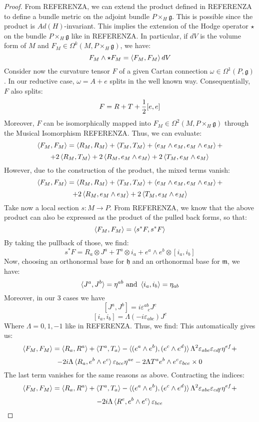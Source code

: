 \documentclass[12pt,a4paper]{report}
\theoremstyle{definition}
\theoremstyle{Theorem}
\theoremstyle{definition}
\theoremstyle{definition}
\begin{document}
	\begin{proof}
		From REFERENZA, we can extend the product defined in REFERENZA to define a bundle metric on the adjoint bundle $P\times_H \mathfrak{g}$. This is possible since the product is $Ad(H)$-invariant. This implies the extension of the Hodge operator $\star$ on the bundle $P\times_H \mathfrak{g}$ like in REFERENZA. In particular, if $dV$ is the volume form of $M$ and $F_M\in\Omega^k(M,P\times_H \mathfrak{g})$, we have:
		$$F_M\wedge \star F_M=\braket{F_M,F_M}dV$$ 
		Consider now the curvature tensor $F$ of a given Cartan connection $\omega\in\Omega^1(P,\mathfrak{g})$. In our reductive case, $\omega=A+e$ splits in the well known way. Consequentially, $F$ also splits:
		$$F=R+T+{1\over 2}[e,e]$$
		Moreover, $F$ can be isomorphically mapped into $F_M\in\Omega^2(M,P\times_H\mathfrak{g})$ through the Musical Isomorphism REFERENZA. Thus, we can evaluate:
		$$\braket{F_M,F_M}=\braket{R_M,R_M}+\braket{T_M,T_M}+\braket{e_M\wedge e_M,e_M\wedge e_M}+$$$$+2\braket{R_M,T_M}+2\braket{R_M,e_M\wedge e_M}+2\braket{T_M,e_M\wedge e_M}$$
		However, due to the construction of the product, the mixed terms vanish:
		$$\braket{F_M,F_M}=\braket{R_M,R_M}+\braket{T_M,T_M}+\braket{e_M\wedge e_M,e_M\wedge e_M}+$$$$+2\braket{R_M,e_M\wedge e_M}+2\braket{T_M,e_M\wedge e_M}$$
		Take now a local section $s:M\rightarrow P$. From REFERENZA, we know that the above product can also be expressed as the product of the pulled back forms, so that:
		$$\braket{F_M,F_M}=\braket{s^*F,s^*F}$$
		By taking the pullback of those, we find:
		$$s^*F=R_a\otimes J^a+T^a\otimes i_a+e^a\wedge e^b\otimes [i_a,i_b]$$
		Now, choosing an orthonormal base for $\mathfrak{h}$ and an orthonormal base for $\mathfrak{m}$, we have:
		$$\braket{J^a,J^b}=\eta^{ab}\hbox{ and }\braket{i_a,i_b}=\eta_{ab}$$
		Moreover, in our 3 cases we have 
		$$[J^a,J^b]=i\varepsilon^{ab}_{\hspace{9pt}c}J^c$$
		$$[i_a,i_b]=\Lambda(-i\varepsilon_{abc})J^c$$
		Where $\Lambda=0,1,-1$ like in REFERENZA. Thus, we find:
		This automatically gives us:
		$$\braket{F_M,F_M}=\braket{R_a,R^a}+\braket{T^a,T_a}-\braket{(e^a\wedge e^b),(e^c\wedge e^d)}\Lambda^2\varepsilon_{abe}\varepsilon_{cdf}\eta^{ef}+$$
		$$-2i\Lambda \braket{R_a,e^b\wedge e^c}\varepsilon_{bce}\eta^{ae}-2\Lambda T^a e^b\wedge e^c\varepsilon_{bce}\times 0$$
		The last term vanishes for the same reasons as above. Contracting the indices:
		$$\braket{F_M,F_M}=\braket{R_a,R^a}+\braket{T^a,T_a}-\braket{(e^a\wedge e^b),(e^c\wedge e^d)}\Lambda^2\varepsilon_{abe}\varepsilon_{cdf}\eta^{ef}+$$
		$$-2i\Lambda \braket{R^e,e^b\wedge e^c}\varepsilon_{bce}$$

\end{proof}
\end{document}
